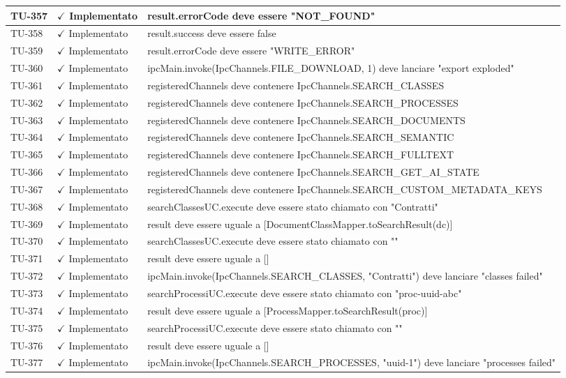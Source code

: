 ﻿\documentclass[a4paper,12pt]{article}
\newcommand{\ok}{\textcolor{green!60!black}{$\checkmark$ Implementato}}
\begin{document}
\begin{longtable}{|p{2cm}|p{3.5cm}|p{9.5cm}|}
\hline
TU-357 & \ok & result.errorCode deve essere "NOT\_FOUND" \\
\hline
TU-358 & \ok & result.success deve essere false \\
\hline
TU-359 & \ok & result.errorCode deve essere "WRITE\_ERROR" \\
\hline
TU-360 & \ok & ipcMain.invoke(IpcChannels.FILE\_DOWNLOAD, 1) deve lanciare "export exploded" \\
\hline
TU-361 & \ok & registeredChannels deve contenere IpcChannels.SEARCH\_CLASSES \\
\hline
TU-362 & \ok & registeredChannels deve contenere IpcChannels.SEARCH\_PROCESSES \\
\hline
TU-363 & \ok & registeredChannels deve contenere IpcChannels.SEARCH\_DOCUMENTS \\
\hline
TU-364 & \ok & registeredChannels deve contenere IpcChannels.SEARCH\_SEMANTIC \\
\hline
TU-365 & \ok & registeredChannels deve contenere IpcChannels.SEARCH\_FULLTEXT \\
\hline
TU-366 & \ok & registeredChannels deve contenere IpcChannels.SEARCH\_GET\_AI\_STATE \\
\hline
TU-367 & \ok & registeredChannels deve contenere IpcChannels.SEARCH\_CUSTOM\_METADATA\_KEYS \\
\hline
TU-368 & \ok & searchClassesUC.execute deve essere stato chiamato con "Contratti" \\
\hline
TU-369 & \ok & result deve essere uguale a [DocumentClassMapper.toSearchResult(dc)] \\
\hline
TU-370 & \ok & searchClassesUC.execute deve essere stato chiamato con "" \\
\hline
TU-371 & \ok & result deve essere uguale a [] \\
\hline
TU-372 & \ok & ipcMain.invoke(IpcChannels.SEARCH\_CLASSES, "Contratti") deve lanciare "classes failed" \\
\hline
TU-373 & \ok & searchProcessiUC.execute deve essere stato chiamato con "proc-uuid-abc" \\
\hline
TU-374 & \ok & result deve essere uguale a [ProcessMapper.toSearchResult(proc)] \\
\hline
TU-375 & \ok & searchProcessiUC.execute deve essere stato chiamato con "" \\
\hline
TU-376 & \ok & result deve essere uguale a [] \\
\hline
TU-377 & \ok & ipcMain.invoke(IpcChannels.SEARCH\_PROCESSES, "uuid-1") deve lanciare "processes failed" \\

\end{longtable}
\end{document}
